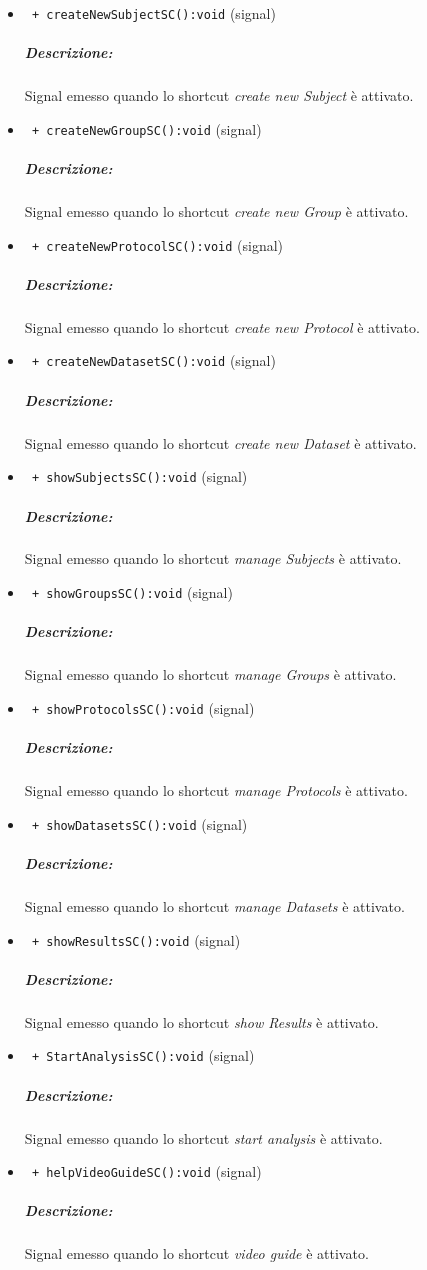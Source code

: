 \begin{itemize}
\item \color{blue}\verb! + createNewSubjectSC():void! (signal)
\color{black} 
\subparagraph{Descrizione:} Signal\g{} emesso quando lo shortcut \textit{create new Subject} è attivato.

\item \color{blue}\verb! + createNewGroupSC():void! (signal)
\color{black} 
\subparagraph{Descrizione:} Signal\g{} emesso quando lo shortcut \textit{create new Group} è attivato.

\item \color{blue}\verb! + createNewProtocolSC():void! (signal)
\color{black} 
\subparagraph{Descrizione:} Signal\g{} emesso quando lo shortcut \textit{create new Protocol} è attivato.

\item \color{blue}\verb! + createNewDatasetSC():void! (signal)
\color{black} 
\subparagraph{Descrizione:} Signal\g{} emesso quando lo shortcut \textit{create new Dataset} è attivato.

\item \color{blue}\verb! + showSubjectsSC():void! (signal)
\color{black} 
\subparagraph{Descrizione:} Signal\g{} emesso quando lo shortcut \textit{manage Subjects} è attivato.

\item \color{blue}\verb! + showGroupsSC():void! (signal)
\color{black} 
\subparagraph{Descrizione:} Signal\g{} emesso quando lo shortcut \textit{manage Groups} è attivato.

\item \color{blue}\verb! + showProtocolsSC():void! (signal)
\color{black} 
\subparagraph{Descrizione:} Signal\g{} emesso quando lo shortcut \textit{manage Protocols} è attivato.

\item \color{blue}\verb! + showDatasetsSC():void! (signal)
\color{black} 
\subparagraph{Descrizione:} Signal\g{} emesso quando lo shortcut \textit{manage Datasets} è attivato.


\item \color{blue}\verb! + showResultsSC():void! (signal)
\color{black} 
\subparagraph{Descrizione:} Signal\g{} emesso quando lo shortcut \textit{show Results} è attivato.

\item \color{blue}\verb! + StartAnalysisSC():void! (signal)
\color{black} 
\subparagraph{Descrizione:} Signal\g{} emesso quando lo shortcut \textit{start analysis} è attivato.

\item \color{blue}\verb! + helpVideoGuideSC():void! (signal)
\color{black} 
\subparagraph{Descrizione:} Signal\g{} emesso quando lo shortcut \textit{video guide} è attivato.


\end{itemize}

